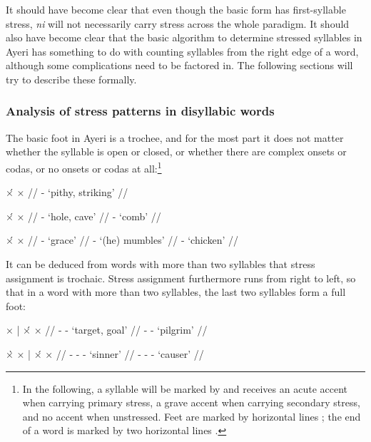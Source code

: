 It should have become clear that even though the basic form  
has first-syllable stress, \textit{ni} will not necessarily carry stress across 
the whole paradigm.%
It should also have become clear that the basic algorithm to determine stressed 
syllables in Ayeri has something to do with counting syllables from the right 
edge of a word, although some complications need to be factored in. The 
following sections will try to describe these formally.

\subsubsection{Analysis of stress patterns in disyllabic words}

The basic foot in Ayeri is a trochee, and for the most part it does not matter 
whether the syllable is open or closed, or whether there are complex onsets or 
codas, or no onsets or codas at all:\footnote{In the following, a syllable will 
be marked by  and receives an acute accent  when carrying 
primary stress, a grave accent \orth{\`{}} when carrying secondary stress, and 
no accent when unstressed. Feet are marked by horizontal lines \orth{|}; the end 
of a word is marked by two horizontal lines \orth{||}.\label{fn:scansion}}

\pex[everygla=\upshape]
\a\begingl
	\gla ×́		{}	×	{} //
	\glb {}	-	 {`pithy, striking'} //
\endgl

\a\begingl
	\gla ×́		{}	×		{} //
	\glb {}	-		{`hole, cave'} //
	\glb {}	-			{`comb'} //
\endgl

\a\begingl
	\gla ×́		{}	×		{} //
	\glb {}	-			{`grace'} //
	\glb {}	-		{`(he) mumbles'} //
	\glb {}	-			{`chicken'} //
\endgl
\xe

It can be deduced from words with more than two syllables that stress 
assignment is trochaic. Stress assignment furthermore runs from right to left, 
so that in a word with more than two syllables, the last two syllables form a 
full foot:

\pex[everygla=\upshape]
\a\begingl
	\gla ×		|	×́		{}	×	 	{} //
	\glb {}	-			-		
{`target, goal'} //
	\glb {}	-			-			
{`pilgrim'} //
\endgl

\a\label{ex:4sylstress}\begingl
	\gla ×̀		{}	×		|	×́		{}	
×		{} //
	\glb {}	-			-			-	
		{`sinner'} //
	\glb {}	-			-			-	
		{`causer'} //
\endgl
\xe


